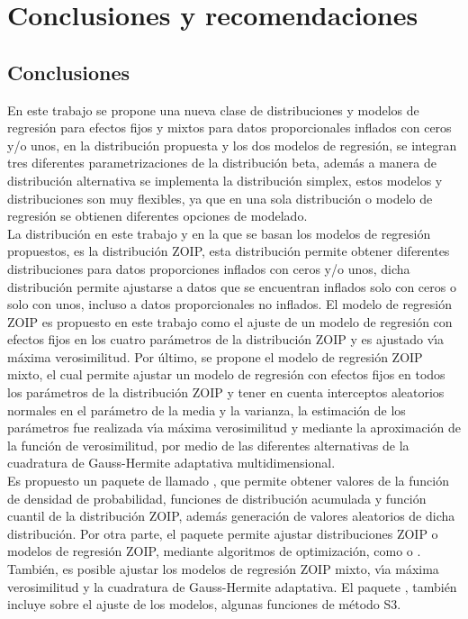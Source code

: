 \chapter{Conclusiones y recomendaciones}\label{cap5}
\section{Conclusiones}

En este trabajo se propone una nueva clase de distribuciones y modelos de regresi\'{o}n para efectos fijos y mixtos para datos proporcionales inflados con ceros y/o unos, en la distribuci\'{o}n propuesta y los dos modelos de regresi\'{o}n, se integran tres diferentes parametrizaciones de la distribuci\'{o}n beta, adem\'{a}s a manera de distribuci\'{o}n alternativa se implementa la distribuci\'{o}n simplex, estos modelos y distribuciones son muy flexibles, ya que en una sola distribuci\'{o}n o modelo de regresi\'{o}n se obtienen diferentes opciones de modelado.\\

La distribuci\'{o}n en este trabajo y en la que se basan los modelos de regresi\'{o}n propuestos, es la distribuci\'{o}n ZOIP, esta distribuci\'{o}n permite obtener diferentes distribuciones para datos proporciones inflados con ceros y/o unos, dicha distribuci\'{o}n permite ajustarse a datos que se encuentran inflados solo con ceros o solo con unos, incluso a datos proporcionales no inflados. El modelo de regresi\'{o}n ZOIP es propuesto en este trabajo como el ajuste de un modelo de regresi\'{o}n con efectos fijos en los cuatro par\'{a}metros de la distribuci\'{o}n ZOIP y es ajustado v\'{\i}a m\'{a}xima verosimilitud. Por \'{u}ltimo, se propone el modelo de regresi\'{o}n ZOIP mixto, el cual permite ajustar un modelo de regresi\'{o}n con efectos fijos en todos los par\'{a}metros de la distribuci\'{o}n ZOIP y tener en cuenta interceptos aleatorios normales en el par\'{a}metro de la media y la varianza, la estimaci\'{o}n de los par\'{a}metros fue realizada v\'{\i}a m\'{a}xima verosimilitud y mediante la aproximaci\'{o}n de la funci\'{o}n de verosimilitud, por medio de las diferentes alternativas de la cuadratura de Gauss-Hermite adaptativa multidimensional.\\
 
Es propuesto un paquete de  llamado , que permite obtener valores de la funci\'{o}n de densidad de probabilidad, funciones de distribuci\'{o}n acumulada y funci\'{o}n cuantil de la distribuci\'{o}n ZOIP, adem\'{a}s generaci\'{o}n de valores aleatorios de dicha distribuci\'{o}n. Por otra parte, el paquete permite ajustar distribuciones ZOIP o modelos de regresi\'{o}n ZOIP, mediante algoritmos de optimizaci\'{o}n, como  o . Tambi\'{e}n, es posible ajustar los modelos de regresi\'{o}n ZOIP mixto, v\'{\i}a m\'{a}xima verosimilitud y la cuadratura de Gauss-Hermite adaptativa. El paquete , tambi\'{e}n incluye sobre el ajuste de los modelos, algunas funciones de m\'{e}todo S3.\\

